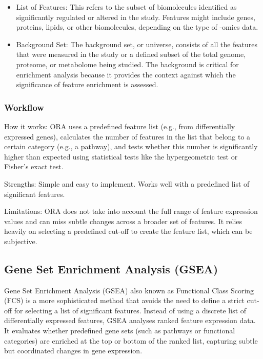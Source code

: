\documentclass[
]{book}
\begin{document}
\begin{itemize}
\item
  {List of Features:} This refers to the subset of biomolecules identified as significantly regulated or altered in the study. Features might include genes, proteins, lipids, or other biomolecules, depending on the type of -omics data.
\item
  {Background Set:} The background set, or universe, consists of all the features that were measured in the study or a defined subset of the total genome, proteome, or metabolome being studied. The background is critical for enrichment analysis because it provides the context against which the significance of feature enrichment is assessed.
\end{itemize}

\hypertarget{workflow}{%
\subsubsection{Workflow}\label{workflow}}

{How it works}: ORA uses a predefined feature list (e.g., from differentially expressed genes), calculates the number of features in the list that belong to a certain category (e.g., a pathway), and tests whether this number is significantly higher than expected using statistical tests like the hypergeometric test or Fisher's exact test.

{Strengths}: Simple and easy to implement. Works well with a predefined list of significant features.

{Limitations}: ORA does not take into account the full range of feature expression values and can miss subtle changes across a broader set of features. It relies heavily on selecting a predefined cut-off to create the feature list, which can be subjective.

\hypertarget{gene-set-enrichment-analysis-gsea}{%
\subsection{Gene Set Enrichment Analysis (GSEA)}\label{gene-set-enrichment-analysis-gsea}}

Gene Set Enrichment Analysis (GSEA) also known as Functional Class Scoring (FCS) is a more sophisticated method that avoids the need to define a strict cut-off for selecting a list of significant features. Instead of using a discrete list of differentially expressed features, GSEA analyses ranked feature expression data. It evaluates whether predefined gene sets (such as pathways or functional categories) are enriched at the top or bottom of the ranked list, capturing subtle but coordinated changes in gene expression.
\end{document}
